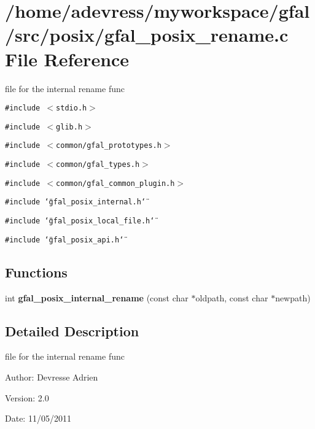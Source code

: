 \section{/home/adevress/myworkspace/gfal/src/posix/gfal\_\-posix\_\-rename.c File Reference}
\label{gfal__posix__rename_8c}
file for the internal rename func 

{\tt \#include $<$stdio.h$>$}\par
{\tt \#include $<$glib.h$>$}\par
{\tt \#include $<$common/gfal\_\-prototypes.h$>$}\par
{\tt \#include $<$common/gfal\_\-types.h$>$}\par
{\tt \#include $<$common/gfal\_\-common\_\-plugin.h$>$}\par
{\tt \#include \char`\"{}gfal\_\-posix\_\-internal.h\char`\"{}}\par
{\tt \#include \char`\"{}gfal\_\-posix\_\-local\_\-file.h\char`\"{}}\par
{\tt \#include \char`\"{}gfal\_\-posix\_\-api.h\char`\"{}}\par
\subsection*{Functions}
\begin{CompactItemize}
\item 
int \textbf{gfal\_\-posix\_\-internal\_\-rename} (const char $\ast$oldpath, const char $\ast$newpath)\label{gfal__posix__rename_8c_a9886d08766043a3fc98454d669b592e}

\end{CompactItemize}


\subsection{Detailed Description}
file for the internal rename func 

\begin{Desc}
\item[Author:]Devresse Adrien \end{Desc}
\begin{Desc}
\item[Version:]2.0 \end{Desc}
\begin{Desc}
\item[Date:]11/05/2011 \end{Desc}
